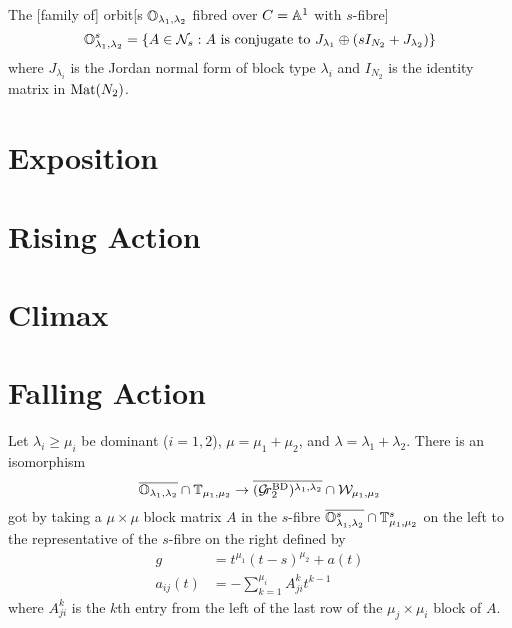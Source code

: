 \documentclass{article}
\begin{document}

The [family of] orbit[s $\OO_{\lambda_1,\lambda_2}$ fibred over $C = \AA^1$ with $s$-fibre]  
\begin{equation}
    \OO_{\lambda_1,\lambda_2}^s = \{A \in \cN_s : A \text{ is conjugate to } J_{\lambda_1}\oplus (sI_{N_2} + J_{\lambda_2})\}
\end{equation}
where $J_{\lambda_i}$ is the Jordan normal form of block type $\lambda_i$ and $I_{N_2}$ is the identity matrix in $\mat(N_2)$.
% 
\section{Exposition}

\section{Rising Action} %

\section{Climax}

\section{Falling Action} %

\begin{theorem}
    Let $\lambda_i\ge\mu_i$ be dominant ($i=1,2$), $\mu = \mu_1 +\mu_2$, and $\lambda =\lambda_1+\lambda_2$. 
    There is an isomorphism 
    \begin{equation}
        \overline{\OO_{\lambda_1,\lambda_2}}\cap\TT_{\mu_1,\mu_2} \to \overline{(\Grbd[2])^{\lambda_1,\lambda_2}}\cap \cW_{\mu_1,\mu_2}
    \end{equation}
    got by taking a $\mu\times\mu$ block matrix $A$ in the $s$-fibre $\overline{\OO_{\lambda_1,\lambda_2}^s}\cap\TT_{\mu_1,\mu_2}^s$ on the left to the representative of the $s$-fibre on the right defined by  
    \begin{equation}
        \begin{split}
            g &= t^{\mu_1} (t-s)^{\mu_2} + a(t) \\
            a_{ij}(t) &= - \sum_{k=1}^{\mu_i} A^k_{ji} t^{k-1}
        \end{split}
    \end{equation}
    where $A^k_{ji}$ is the $k$th entry from the left of the last row of the $\mu_j\times\mu_i$ block of $A$. 
\end{theorem}
\end{document}
